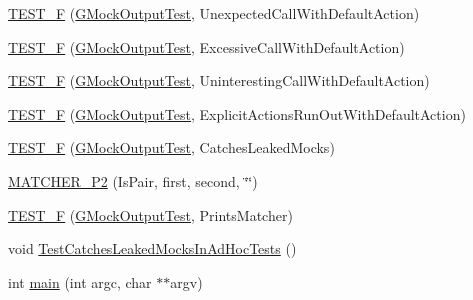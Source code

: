 \begin{DoxyCompactItemize}
\item 
\mbox{\hyperlink{_obj__test_2lib_2googletest-release-1_88_81_2googlemock_2test_2gmock__output__test___8cc_a4ac1ba04aede81f6771240e1c719a28e}{T\+E\+S\+T\+\_\+F}} (\mbox{\hyperlink{class_g_mock_output_test}{G\+Mock\+Output\+Test}}, Unexpected\+Call\+With\+Default\+Action)
\item 
\mbox{\hyperlink{_obj__test_2lib_2googletest-release-1_88_81_2googlemock_2test_2gmock__output__test___8cc_a521e2dc9f8197c96e992901a5e39f5cd}{T\+E\+S\+T\+\_\+F}} (\mbox{\hyperlink{class_g_mock_output_test}{G\+Mock\+Output\+Test}}, Excessive\+Call\+With\+Default\+Action)
\item 
\mbox{\hyperlink{_obj__test_2lib_2googletest-release-1_88_81_2googlemock_2test_2gmock__output__test___8cc_afcf833faaa33197a2f9815425f101d8c}{T\+E\+S\+T\+\_\+F}} (\mbox{\hyperlink{class_g_mock_output_test}{G\+Mock\+Output\+Test}}, Uninteresting\+Call\+With\+Default\+Action)
\item 
\mbox{\hyperlink{_obj__test_2lib_2googletest-release-1_88_81_2googlemock_2test_2gmock__output__test___8cc_a885556bf2f15e4a3d2eddac44dd7fc2b}{T\+E\+S\+T\+\_\+F}} (\mbox{\hyperlink{class_g_mock_output_test}{G\+Mock\+Output\+Test}}, Explicit\+Actions\+Run\+Out\+With\+Default\+Action)
\item 
\mbox{\hyperlink{_obj__test_2lib_2googletest-release-1_88_81_2googlemock_2test_2gmock__output__test___8cc_add20a01035182eac6e1278d06e001d04}{T\+E\+S\+T\+\_\+F}} (\mbox{\hyperlink{class_g_mock_output_test}{G\+Mock\+Output\+Test}}, Catches\+Leaked\+Mocks)
\item 
\mbox{\hyperlink{_obj__test_2lib_2googletest-release-1_88_81_2googlemock_2test_2gmock__output__test___8cc_ad6a4a921b72d12237933afe1de0c5c51}{M\+A\+T\+C\+H\+E\+R\+\_\+\+P2}} (Is\+Pair, first, second, \char`\"{}\char`\"{})
\item 
\mbox{\hyperlink{_obj__test_2lib_2googletest-release-1_88_81_2googlemock_2test_2gmock__output__test___8cc_a696afa4fa45b0e98ec9db1fe445fa679}{T\+E\+S\+T\+\_\+F}} (\mbox{\hyperlink{class_g_mock_output_test}{G\+Mock\+Output\+Test}}, Prints\+Matcher)
\item 
void \mbox{\hyperlink{_obj__test_2lib_2googletest-release-1_88_81_2googlemock_2test_2gmock__output__test___8cc_af634a5c16bccc1861e3fab3181bad4a0}{Test\+Catches\+Leaked\+Mocks\+In\+Ad\+Hoc\+Tests}} ()
\item 
int \mbox{\hyperlink{_obj__test_2lib_2googletest-release-1_88_81_2googlemock_2test_2gmock__output__test___8cc_a3c04138a5bfe5d72780bb7e82a18e627}{main}} (int argc, char $\ast$$\ast$argv)
\end{DoxyCompactItemize}


